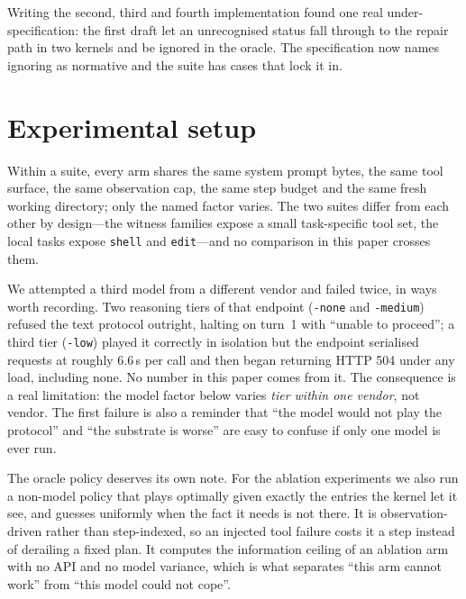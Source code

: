 \documentclass[11pt,a4paper]{article}
\begin{document}
Writing the second, third and fourth implementation found one real
under-specification: the first draft let an unrecognised status fall through to
the repair path in two kernels and be ignored in the oracle. The specification
now names ignoring as normative and the suite has cases that lock it in.

\section{Experimental setup}
\label{sec:setup}

Within a suite, every arm shares the same system prompt bytes, the same tool
surface, the same observation cap, the same step budget and the same fresh
working directory; only the named factor varies. The two suites differ from
each other by design---the witness families expose a small task-specific tool
set, the local tasks expose \texttt{shell} and \texttt{edit}---and no
comparison in this paper crosses them.

\begin{table}[h]\centering\small
\caption{Models. Decoding parameters are recorded rather than assumed,
because endpoints differ in what they accept.}
\label{tab:models}

\end{table}

We attempted a third model from a different vendor and failed twice, in ways
worth recording. Two reasoning tiers of that endpoint (\texttt{-none} and
\texttt{-medium}) refused the text protocol outright, halting on turn~1 with
``unable to proceed''; a third tier (\texttt{-low}) played it correctly in
isolation but the endpoint serialised requests at roughly 6.6\,s per call and
then began returning HTTP 504 under any load, including none. No number in this
paper comes from it. The consequence is a real limitation: the model factor
below varies \emph{tier within one vendor}, not vendor. The first failure is
also a reminder that ``the model would not play the protocol'' and ``the
substrate is worse'' are easy to confuse if only one model is ever run.

The oracle policy deserves its own note. For the ablation experiments we also
run a non-model policy that plays optimally given exactly the entries the
kernel let it see, and guesses uniformly when the fact it needs is not there.
It is observation-driven rather than step-indexed, so an injected tool failure
costs it a step instead of derailing a fixed plan. It computes the information
ceiling of an ablation arm with no API and no model variance, which is what
separates ``this arm cannot work'' from ``this model could not cope''.
\end{document}
